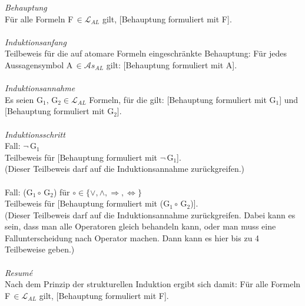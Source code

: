 \textit{Behauptung}\\
Für alle Formeln F$\, \in \mathcal{L}_{AL}$ gilt, [Behauptung formuliert mit F].\\
\\
\textit{Induktionsanfang}\\
Teilbeweis für die auf atomare Formeln eingeschränkte Behauptung: Für jedes Aussagensymbol
A$\, \in \mathcal{A}s_{AL}$ gilt: [Behauptung formuliert mit A].\\
\\
\textit{Induktionsannahme}\\
Es seien G$_{1}, \,$G$_{2} \in \mathcal{L}_{AL}$ Formeln, für die gilt: [Behauptung formuliert mit G$_{1}$] und [Behauptung
formuliert mit G$_{2}$].\\
\\
\textit{Induktionsschritt}\\
Fall: $\neg \,$G$_{1}$\\
Teilbeweis für [Behauptung formuliert mit $\neg \,$G$_{1}$].\\
(Dieser Teilbeweis darf auf die Induktionsannahme zurückgreifen.)\\
\\
Fall: (G$_{1} \circ \,$G$_{2}$) für $\circ \in \{\vee, \wedge, \Rightarrow, \Leftrightarrow\}$\\
Teilbeweis für [Behauptung formuliert mit (G$_{1} \circ \,$G$_{2}$)].\\
(Dieser Teilbeweis darf auf die Induktionsannahme zurückgreifen. Dabei kann es sein, dass
man alle Operatoren gleich behandeln kann, oder man muss eine Fallunterscheidung nach
Operator machen. Dann kann es hier bis zu 4 Teilbeweise geben.)\\
\\
\textit{Resumé}\\
Nach dem Prinzip der strukturellen Induktion ergibt sich damit: Für alle Formeln F$\, \in \mathcal{L}_{AL}$
gilt, [Behauptung formuliert mit F].